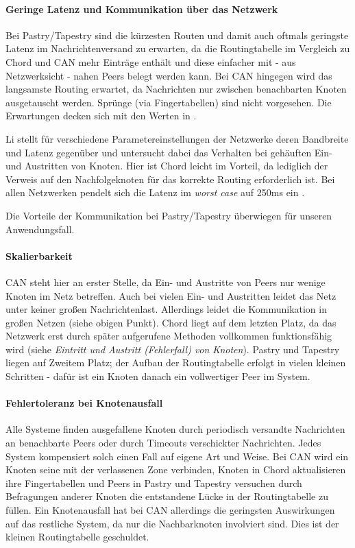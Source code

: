 \paragraph{Geringe Latenz und Kommunikation über das Netzwerk}
Bei Pastry/Tapestry sind die kürzesten Routen und damit auch oftmals geringste Latenz im Nachrichtenversand zu erwarten, da die Routingtabelle im Vergleich zu Chord und CAN mehr Einträge enthält und diese einfacher mit - aus Netzwerksicht - nahen Peers belegt werden kann. Bei CAN hingegen wird das langsamste Routing erwartet, da Nachrichten nur zwischen benachbarten Knoten ausgetauscht werden. Sprünge (via Fingertabellen) sind nicht vorgesehen. Die Erwartungen decken sich mit den Werten in .

Li stellt für verschiedene Parametereinstellungen der Netzwerke deren Bandbreite und Latenz gegenüber und untersucht dabei das Verhalten bei gehäuften Ein- und Austritten von Knoten. Hier ist Chord leicht im Vorteil, da lediglich der Verweis auf den Nachfolgeknoten für das korrekte Routing erforderlich ist. Bei allen Netzwerken pendelt sich die Latenz im \emph{worst case} auf 250ms ein \cite{Li2004Comparing}.

Die Vorteile der Kommunikation bei Pastry/Tapestry überwiegen für unseren Anwendungsfall.

\paragraph{Skalierbarkeit}
CAN steht hier an erster Stelle, da Ein- und Austritte von Peers nur wenige Knoten im Netz betreffen. Auch bei vielen Ein- und Austritten leidet das Netz unter keiner großen Nachrichtenlast. Allerdings leidet die Kommunikation in großen Netzen (siehe obigen Punkt). Chord liegt auf dem letzten Platz, da das Netzwerk erst durch später aufgerufene Methoden vollkommen funktionsfähig wird (siehe \emph{Eintritt und Austritt (Fehlerfall) von Knoten}).  Pastry und Tapestry liegen auf Zweitem Platz; der Aufbau der Routingtabelle erfolgt in vielen kleinen Schritten - dafür ist ein Knoten danach ein vollwertiger Peer im System.

\paragraph{Fehlertoleranz bei Knotenausfall}
Alle Systeme finden ausgefallene Knoten durch periodisch versandte Nachrichten an benachbarte Peers oder durch Timeouts verschickter Nachrichten. Jedes System kompensiert solch einen Fall auf eigene Art und Weise. Bei CAN wird ein Knoten seine mit der verlassenen Zone verbinden, Knoten in Chord aktualisieren ihre Fingertabellen und Peers in Pastry und Tapestry versuchen durch Befragungen anderer Knoten die entstandene Lücke in der Routingtabelle zu füllen. Ein Knotenausfall hat bei CAN allerdings die geringsten Auswirkungen auf das restliche System, da nur die Nachbarknoten involviert sind. Dies ist der kleinen Routingtabelle geschuldet.


